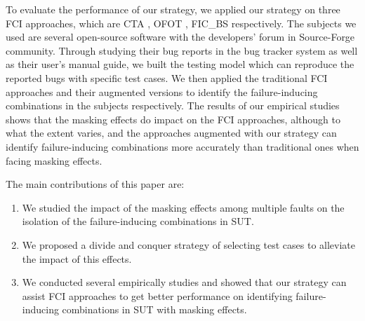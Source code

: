 \documentclass{sig-alternate}
\begin{document}


To evaluate the performance of our strategy, we applied our strategy on three FCI approaches, which are CTA \cite{yilmaz2006covering}, OFOT \cite{nie2011minimal}, FIC\_BS \cite{zhang2011characterizing} respectively. The subjects we used are several open-source software with the developers' forum in Source-Forge community. Through studying their bug reports in the bug tracker system as well as their user's manual guide, we built the testing model which can reproduce the reported bugs with specific test cases. We then applied the traditional FCI approaches and their augmented versions to identify the failure-inducing combinations in the subjects respectively. The results of our empirical studies shows that the masking effects do impact on the FCI approaches, although to what the extent varies, and the approaches augmented with our strategy can identify failure-inducing combinations more accurately than traditional ones when facing masking effects.

The main contributions of this paper are:
\begin{enumerate}
 \item We studied the impact of the masking effects among multiple faults on the isolation of the failure-inducing combinations in SUT.
 \item We proposed a divide and conquer strategy of selecting test cases to alleviate the impact of this effects.
 \item We conducted several empirically studies and showed that our strategy can assist FCI approaches to get better performance on identifying failure-inducing combinations in SUT with masking effects.
\end{enumerate}
\end{document}

